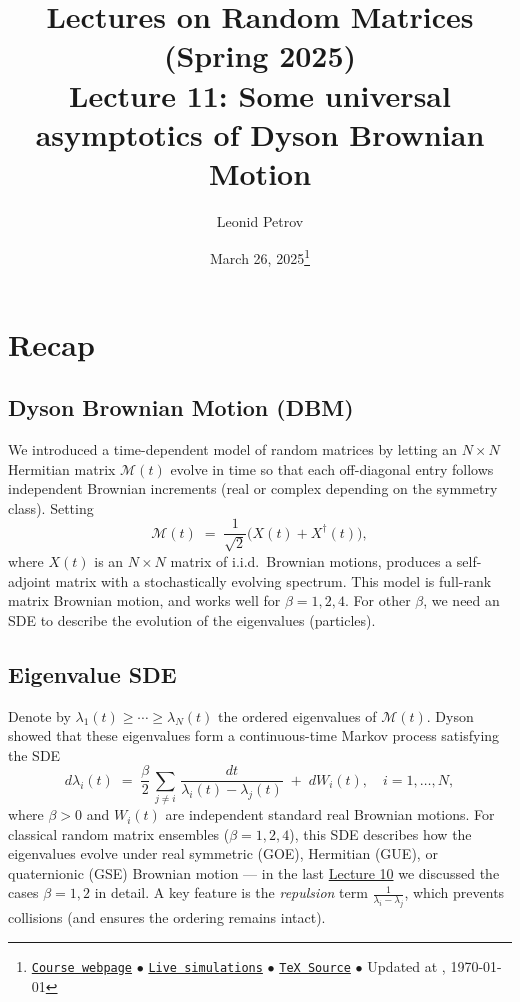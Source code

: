 \documentclass[letterpaper,11pt,oneside,reqno]{article}
\numberwithin{equation}{section}
\theoremstyle{definition}
\begin{document}
\title{Lectures on Random Matrices
(Spring 2025)
\\Lecture 11: Some universal asymptotics of Dyson Brownian Motion}


\date{March 26, 2025\footnote{\href{https://lpetrov.cc/rmt25/}{\texttt{Course webpage}}
$\bullet$ \href{https://lpetrov.cc/simulations/model/random-matrices/}{\texttt{Live simulations}}
$\bullet$ \href{https://lpetrov.cc/rmt25/rmt25-notes/rmt2025-l11.tex}{\texttt{TeX Source}}
$\bullet$
Updated at \currenttime, \today}}



\author{Leonid Petrov}


\maketitle
\tableofcontents

\section{Recap}

\subsection{Dyson Brownian Motion (DBM)}
We introduced a time-dependent model of random matrices by letting an
\(N\times N\) Hermitian matrix \(\mathcal{M}(t)\) evolve in time so that each
off-diagonal entry follows independent Brownian increments (real or complex
depending on the symmetry class).  Setting
\[
\mathcal{M}(t) \;=\; \frac{1}{\sqrt{2}}\bigl(X(t) + X^\dagger(t)\bigr),
\]
where \(X(t)\) is an \(N\times N\) matrix of i.i.d.\ Brownian motions,
produces a self-adjoint matrix with a stochastically evolving spectrum.
This model is full-rank matrix Brownian motion,
and works well for $\beta=1,2,4$.
For other $\beta$, we need an SDE to describe the evolution of the eigenvalues (particles).

\subsection{Eigenvalue SDE}
Denote by \(\lambda_1(t)\ge\cdots\ge\lambda_N(t)\) the ordered eigenvalues of
\(\mathcal{M}(t)\).  Dyson showed that these eigenvalues form a
continuous-time Markov process satisfying the SDE
\[
d\lambda_i(t)
\;=\;
\frac{\beta}{2}\,\sum_{j\neq i}\,\frac{dt}{\lambda_i(t)-\lambda_j(t)}
\;+\;
dW_i(t),
\quad
i=1,\dots,N,
\]
where \(\beta>0\) and \(W_i(t)\) are independent standard real Brownian motions.
For classical random matrix ensembles (\(\beta=1,2,4\)), this SDE describes how
the eigenvalues evolve under real symmetric (GOE), Hermitian (GUE), or
quaternionic (GSE) Brownian motion --- in the last \href{https://lpetrov.cc/rmt25/rmt25-notes/rmt2025-l10.pdf}{Lecture 10} we discussed the cases \(\beta=1,2\) in detail.
A key feature is the \emph{repulsion} term
\(\frac{1}{\lambda_i-\lambda_j}\), which prevents collisions (and ensures the
ordering remains intact).
\end{document}
